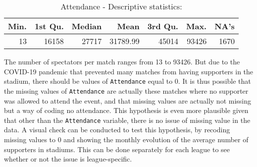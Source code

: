 \documentclass[
]{article}
\newenvironment{Shaded}{\begin{snugshade}}{\end{snugshade}}
\newcommand{\CommentTok}[1]{\textcolor[rgb]{0.56,0.35,0.01}{\textit{#1}}}
\newcommand{\DataTypeTok}[1]{\textcolor[rgb]{0.13,0.29,0.53}{#1}}
\newcommand{\KeywordTok}[1]{\textcolor[rgb]{0.13,0.29,0.53}{\textbf{#1}}}
\newcommand{\NormalTok}[1]{#1}
\newcommand{\OperatorTok}[1]{\textcolor[rgb]{0.81,0.36,0.00}{\textbf{#1}}}
\newcommand{\StringTok}[1]{\textcolor[rgb]{0.31,0.60,0.02}{#1}}
\begin{document}
\begin{Shaded}
\end{Shaded}

\begin{table}

\caption{\label{tab:unnamed-chunk-6}Attendance - Descriptive statistics:}
\centering
\begin{tabular}[t]{rrrrrrr}
\toprule
Min. & 1st Qu. & Median & Mean & 3rd Qu. & Max. & NA's\\
\midrule
13 & 16158 & 27717 & 31789.99 & 45014 & 93426 & 1670\\
\bottomrule
\end{tabular}
\end{table}

The number of spectators per match ranges from 13 to 93426. But due to
the COVID-19 pandemic that prevented many matches from having supporters
in the stadium, there should be values of \texttt{Attendance} equal to
0. It is thus possible that the missing values of \texttt{Attendance}
are actually these matches where no supporter was allowed to attend the
event, and that missing values are actually not missing but a way of
coding no attendance. This hypothesis is even more plausible given that
other than the \texttt{Attendance} variable, there is no issue of
missing value in the data. A visual check can be conducted to test this
hypothesis, by recoding missing values to 0 and showing the monthly
evolution of the average number of supporters in stadiums. This can be
done separately for each league to see whether or not the issue is
league-specific.
\end{document}
